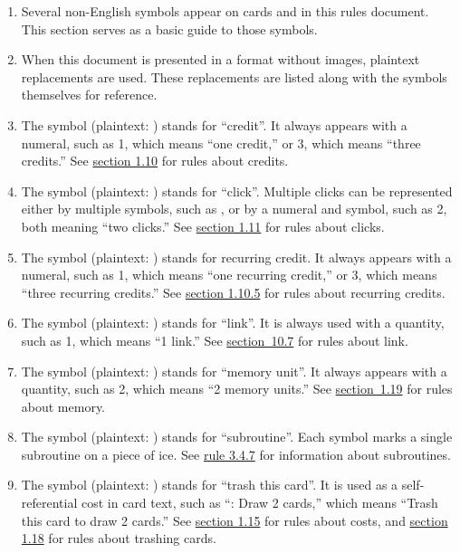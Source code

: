\begin{enumerate}
	\item Several non-English symbols appear on cards and in this rules document. This section serves as a basic guide to those symbols.
	\item When this document is presented in a format without images, plaintext replacements are used. These replacements are listed along with the symbols themselves for reference.
	\item The symbol \credit (plaintext: \credit) stands for ``credit''. It always appears with a numeral, such as 1\credit, which means ``one credit,'' or 3\credit, which means ``three credits.'' See \hyperlink{page.i}{section 1.10} for rules about credits.
	\item The symbol \click (plaintext: \click) stands for ``click''. Multiple clicks can be represented either by multiple symbols, such as \click\click, or by a numeral and symbol, such as 2\click, both meaning ``two clicks.'' See \hyperlink{page.i}{section 1.11} for rules about clicks.
	\item The symbol \recurring (plaintext: \recurring) stands for recurring credit. It always appears with a numeral, such as 1\recurring, which means ``one recurring credit,'' or 3\recurring, which means ``three recurring credits.'' See \hyperlink{page.i}{section 1.10.5} for rules about recurring credits.
	\item The symbol \link (plaintext: \link) stands for ``link''. It is always used with a quantity, such as 1\link, which means ``1 link.'' See \hyperlink{page.i}{section~10.7} for rules about link.
	\item The symbol \MU (plaintext: \MU) stands for ``memory unit''. It always appears with a quantity, such as 2\MU, which means ``2 memory units.'' See \hyperlink{page.i}{section~1.19} for rules about memory.
	\item The symbol \sub (plaintext: \sub) stands for ``subroutine''. Each symbol marks a single subroutine on a piece of ice. See \hyperlink{page.i}{rule 3.4.7} for information about subroutines.
	\item The symbol \trash (plaintext: \trash) stands for ``trash this card''. It is used as a self-referential cost in card text, such as ``\trash: Draw 2 cards,'' which means ``Trash this
	      card to draw 2 cards.'' See \hyperlink{page.i}{section 1.15} for rules about costs, and \hyperlink{page.i}{section 1.18} for rules about trashing cards.
\end{enumerate}
